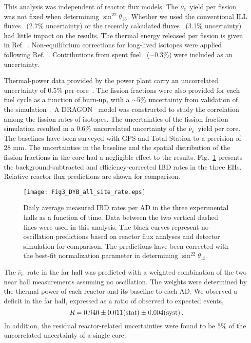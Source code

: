 \documentclass[aps,prl,showpacs,showkeys,amsmath,amssymb,
twocolumn,
floatfix,
superscriptaddress
]{revtex4-1}
\newcommand{\nuebar}{$\overline{\nu}_{e}$}
\begin{document}
\par
This analysis was independent of reactor flux models. The \nuebar\ yield per fission~\cite{declais} was not fixed when determining $\sin^22\theta_{13}$. Whether we used the conventional ILL fluxes~\cite{illschr,illvonf,illhahn,vogel238} (2.7\% uncertainty) or the recently calculated fluxes~\cite{huber,mueller} (3.1\% uncertainty) had little impact on the results. The thermal energy released per fission is given in Ref.~\cite{kopeikin}. Non-equilibrium corrections for long-lived isotopes were applied following Ref.~\cite{mueller}. Contributions from spent fuel~\cite{anfp,zhoub} ($\sim$0.3\%) were included as an uncertainty.



\par
Thermal-power data provided by the power plant carry an uncorrelated uncertainty of 0.5\% per core~\cite{cjflux,kme,helishi}. The fission fractions were also provided for each fuel cycle as a function of burn-up, with a $\sim$5\% uncertainty from validation of the simulation~\cite{sciencecode,appollo}. A DRAGON~\cite{dragon} model was constructed to study the correlation among the fission rates of isotopes. The uncertainties of the fission fraction simulation resulted in a 0.6\% uncorrelated uncertainty of the \nuebar\ yield per core. The baselines have been surveyed with GPS and Total Station to a precision of 28 mm. The uncertainties in the baseline  and the spatial distribution of the fission fractions in the core had a negligible effect to the results.
Fig.~\ref{fig:flux} presents the background-subtracted and efficiency-corrected IBD rates in the three EHs. Relative reactor flux predictions are shown for comparison.


\begin{figure}[htb]
\texttt{[image: Fig3\_DYB\_all\_site\_rate.eps]}
\caption{Daily average measured IBD rates per AD in the three experimental halls as a function of time. Data between the two vertical dashed lines were used in this analysis. The black curves represent no-oscillation predictions based on reactor flux analyses and detector simulation for comparison. The predictions have been corrected with the best-fit normalization parameter in determining $\sin^22\theta_{13}$.  \label{fig:flux}}
\end{figure}

\par
The \nuebar\ rate in the far hall was predicted with a weighted combination of the two near hall measurements assuming no oscillation. The weights were determined by the thermal power of each reactor and its baseline to each AD. We observed a deficit in the far hall, expressed as a ratio of observed to expected events,
\begin{equation}
R=0.940\pm 0.011({\rm stat}) \pm 0.004({\rm syst})\,.\nonumber
\end{equation}
\noindent In addition, the residual reactor-related uncertainties were found to be 5\% of the uncorrelated uncertainty of a single core.
\end{document}

